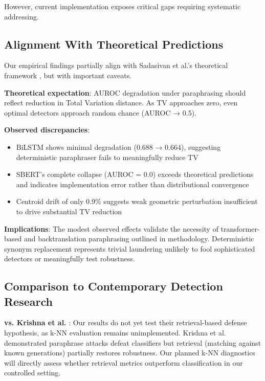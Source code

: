 \documentclass[conference]{IEEEtran}
\begin{document}
However, current implementation exposes critical gaps requiring systematic addressing.

\subsection{Alignment With Theoretical Predictions}

Our empirical findings partially align with Sadasivan et al.'s theoretical framework \cite{sadasivan2023can}, but with important caveats.

\textbf{Theoretical expectation}: AUROC degradation under paraphrasing should reflect reduction in Total Variation distance. As TV approaches zero, even optimal detectors approach random chance (AUROC → 0.5).

\textbf{Observed discrepancies}:
\begin{itemize}
    \item BiLSTM shows minimal degradation (0.688 → 0.664), suggesting deterministic paraphraser fails to meaningfully reduce TV
    \item SBERT's complete collapse (AUROC = 0.0) exceeds theoretical predictions and indicates implementation error rather than distributional convergence
    \item Centroid drift of only 0.9\% suggests weak geometric perturbation insufficient to drive substantial TV reduction
\end{itemize}

\textbf{Implications}: The modest observed effects validate the necessity of transformer-based and backtranslation paraphrasing outlined in methodology. Deterministic synonym replacement represents trivial laundering unlikely to fool sophisticated detectors or meaningfully test robustness.

\subsection{Comparison to Contemporary Detection Research}

\textbf{vs. Krishna et al.} \cite{krishna2023paraphrasing}: Our results do not yet test their retrieval-based defense hypothesis, as k-NN evaluation remains unimplemented. Krishna et al. demonstrated paraphrase attacks defeat classifiers but retrieval (matching against known generations) partially restores robustness. Our planned k-NN diagnostics will directly assess whether retrieval metrics outperform classification in our controlled setting.
\end{document}

